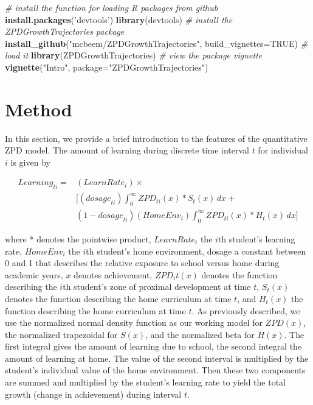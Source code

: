 \documentclass[english,floatsintext,jou]{apa6}
\newenvironment{Shaded}{\begin{snugshade}}{\end{snugshade}}
\newcommand{\KeywordTok}[1]{\textcolor[rgb]{0.13,0.29,0.53}{\textbf{{#1}}}}
\newcommand{\DataTypeTok}[1]{\textcolor[rgb]{0.13,0.29,0.53}{{#1}}}
\newcommand{\StringTok}[1]{\textcolor[rgb]{0.31,0.60,0.02}{{#1}}}
\newcommand{\CommentTok}[1]{\textcolor[rgb]{0.56,0.35,0.01}{\textit{{#1}}}}
\newcommand{\OtherTok}[1]{\textcolor[rgb]{0.56,0.35,0.01}{{#1}}}
\newcommand{\NormalTok}[1]{{#1}}
\theoremstyle{definition}
\theoremstyle{definition}
\theoremstyle{definition}
\theoremstyle{remark}
\begin{document}
\scriptsize

\begin{Shaded}
\begin{Highlighting}[]
\CommentTok{# install the function for loading R packages from github}
\KeywordTok{install.packages}\NormalTok{(}\StringTok{'devtools'}\NormalTok{)}
\KeywordTok{library}\NormalTok{(devtools)}
\CommentTok{# install the ZPDGrowthTrajectories package}
\KeywordTok{install_github}\NormalTok{(}\StringTok{"mcbeem/ZPDGrowthTrajectories"}\NormalTok{, }
               \DataTypeTok{build_vignettes=}\OtherTok{TRUE}\NormalTok{)}
\CommentTok{# load it}
\KeywordTok{library}\NormalTok{(ZPDGrowthTrajectories)}
\CommentTok{# view the package vignette}
\KeywordTok{vignette}\NormalTok{(}\StringTok{"Intro"}\NormalTok{, }\DataTypeTok{package=}\StringTok{"ZPDGrowthTrajectories"}\NormalTok{)}
\end{Highlighting}
\end{Shaded}

\normalsize

\section{Method}\label{method}

In this section, we provide a brief introduction to the features of the
quantitative ZPD model. The amount of learning during discrete time
interval \(t\) for individual \(i\) is given by

\small

\begin{equation}
\begin{split}
\textit{Learning}_{ti} = & (\textit{LearnRate}_i) \times \,  \\
  & \big[ ( \textit{dosage}_{ti})  \int_{0}^{\infty} \textit{ZPD}_{ti}(x) * S_t(x) \, dx  + \\ 
  & (1-\textit{dosage}_{ti}) (\textit{HomeEnv}_i)  \int_{0}^{\infty} \textit{ZPD}_{ti}(x) * H_t(x) \, dx \big]
\end{split}
\end{equation}

\normalsize

where * denotes the pointwise product, \(LearnRate_i\) the \(i\)th
student's learning rate, \(HomeEnv_i\) the \(i\)th student's home
environment, dosage a constant between 0 and 1 that describes the
relative exposure to school versus home during academic years, \(x\)
denotes achievement, \(ZPD_it(x)\) denotes the function describing the
\(i\)th student's zone of proximal development at time \(t\), \(S_t(x)\)
denotes the function describing the home curriculum at time \(t\), and
\(H_t(x)\) the function describing the home curriculum at time \(t\). As
previously described, we use the normalized normal density function as
our working model for \(ZPD(x)\), the normalized trapezoidal for
\(S(x)\), and the normalized beta for \(H(x)\). The first integral gives
the amount of learning due to school, the second integral the amount of
learning at home. The value of the second interval is multiplied by the
student's individual value of the home environment. Then these two
components are summed and multiplied by the student's learning rate to
yield the total growth (change in achievement) during interval \(t\).
\end{document}
